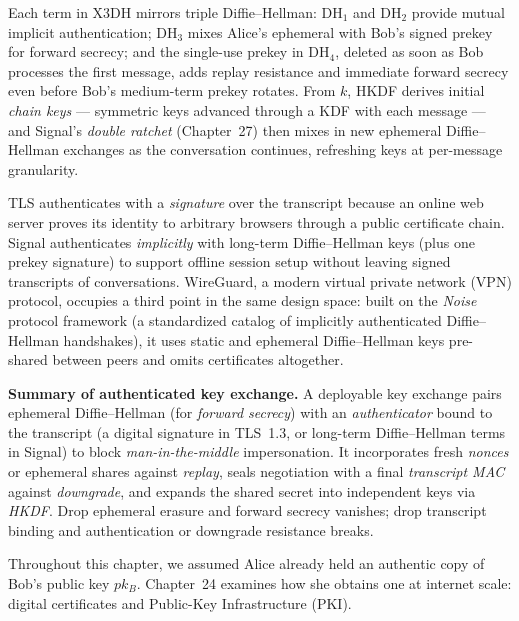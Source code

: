 Each term in X3DH mirrors triple Diffie--Hellman: $\mathrm{DH}_1$ and
$\mathrm{DH}_2$ provide mutual implicit authentication; $\mathrm{DH}_3$ mixes
Alice's ephemeral with Bob's signed prekey for forward secrecy; and the
single-use prekey in $\mathrm{DH}_4$, deleted as soon as Bob processes the first
message, adds replay resistance and immediate forward secrecy even before Bob's
medium-term prekey rotates. From $k$, HKDF derives initial \emph{chain keys} ---
symmetric keys advanced through a KDF with each message --- and Signal's
\emph{double ratchet} (Chapter~27) then mixes in new ephemeral Diffie--Hellman
exchanges as the conversation continues, refreshing keys at per-message
granularity.

\begin{applicationbox}
TLS authenticates with a \emph{signature} over the transcript because an online
web server proves its identity to arbitrary browsers through a public
certificate chain. Signal authenticates \emph{implicitly} with long-term
Diffie--Hellman keys (plus one prekey signature) to support offline session
setup without leaving signed transcripts of conversations. WireGuard, a modern
virtual private network (VPN) protocol, occupies a third point in the same
design space: built on the \emph{Noise} protocol framework (a standardized
catalog of implicitly authenticated Diffie--Hellman handshakes), it uses static
and ephemeral Diffie--Hellman keys pre-shared between peers and omits
certificates altogether.
\end{applicationbox}

\begin{focusbox}
\textbf{Summary of authenticated key exchange.}
A deployable key exchange pairs ephemeral Diffie--Hellman (for \emph{forward
secrecy}) with an \emph{authenticator} bound to the transcript (a digital
signature in TLS~1.3, or long-term Diffie--Hellman terms in Signal) to block
\emph{man-in-the-middle} impersonation. It incorporates fresh \emph{nonces} or
ephemeral shares against \emph{replay}, seals negotiation with a final
\emph{transcript MAC} against \emph{downgrade}, and expands the shared secret
into independent keys via \emph{HKDF}. Drop ephemeral erasure and forward
secrecy vanishes; drop transcript binding and authentication or downgrade
resistance breaks.
\end{focusbox}

Throughout this chapter, we assumed Alice already held an authentic copy of
Bob's public key $pk_B$. Chapter~24 examines how she obtains one at internet
scale: digital certificates and Public-Key Infrastructure (PKI).

